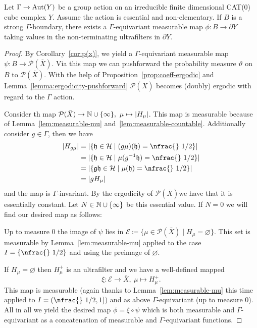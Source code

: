 \begin{thm}[{\cite[Theorem~4.1]{MR3509968}}]
  \label{thm:4.1}
  Let \(\Gamma \to \operatorname{Aut}(Y)\) be a group action on an irreducible finite dimensional CAT(0) cube complex \(Y\). Assume the action is essential and non-elementary. If \(B\) is a strong \(\Gamma\)-boundary, there exists a \(\Gamma\)-equivariant measurable map \(\phi\colon B \to \partial Y\) taking values in the non-terminating ultrafilters in \(\partial Y\).
\end{thm}

\begin{proof}
  By Corollary~\ref{cor:p(x)}, we yield a \(\Gamma\)-equivariant measurable map \(\psi\colon B \to \mathcal{P}(\bar X)\). Via this map we can pushforward the probability measure \(\vartheta\) on \(B\) to \(\mathcal{P}(\bar X)\). With the help of Proposition~\ref{prop:coeff-ergodic} and Lemma~\ref{lemma:ergodicity-pushforward} \(\mathcal{P}(\bar X)\) becomes (doubly) ergodic with regard to the \(\Gamma\) action.

  Consider th map \(\mathcal{P}(\bar X) \to \mathbb{N} \cup \{\infty\},\ \mu \mapsto |H_\mu|\). This map is measurable because of Lemma~\ref{lem:measurable-mu} and~\ref{lem:measurable-countable}. Additionally consider \(g \in \Gamma\), then we have
  \begin{align*}
    |H_{g\mu}|
    & = |\{\mathfrak{h} \in \mathcal{H} \mid (g\mu)(\mathfrak{h}) = \text{\nfrac{} 1/2}\}|\\
    & = |\{\mathfrak{h} \in \mathcal{H} \mid \mu(g^{-1} \mathfrak{h}) = \text{\nfrac{} 1/2}\}|\\
    & = |\{\mathfrak{gh} \in \mathcal{H} \mid \mu(\mathfrak{h}) = \text{\nfrac{} 1/2}\}|\\
    & = |g H_\mu|
  \end{align*}
  and the map is \(\Gamma\)-invariant. By the ergodicity of \(\mathcal{P}(\bar X)\)we have that it is essentially constant. Let \(N \in \mathbb{N} \cup \{\infty\}\) be this essential value. If \(N = 0\) we will find our desired map as follows:

  Up to measure 0 the image of \(\psi\) lies in \(\mathcal{E} \coloneqq \{ \mu \in \mathcal{P}(\bar X) \mid H_\mu = \varnothing\}\). This set is measurable by Lemma~\ref{lem:measurable-mu} applied to the case \(I = \{\text{\nfrac{} 1/2}\}\) and using the preimage of \(\varnothing\).

  If \(H_\mu = \varnothing\) then \(H_\mu^+\) is an ultrafilter and we have a well-defined mapped
  \[
    \xi\colon \mathcal{E} \to \bar X,\ \mu \mapsto H_\mu^+.
  \]
  This map is measurable (again thanks to Lemma~\ref{lem:measurable-mu} this time applied to \(I = (\text{\nfrac{} 1/2}, 1]\)) and as above \(\Gamma\)-equivariant (up to measure 0). All in all we yield the desired map \(\phi = \xi \circ \psi\) which is both measurable and \(\Gamma\)-equivariant as a concatenation of measurable and \(\Gamma\)-equivariant functions.


\end{proof}
